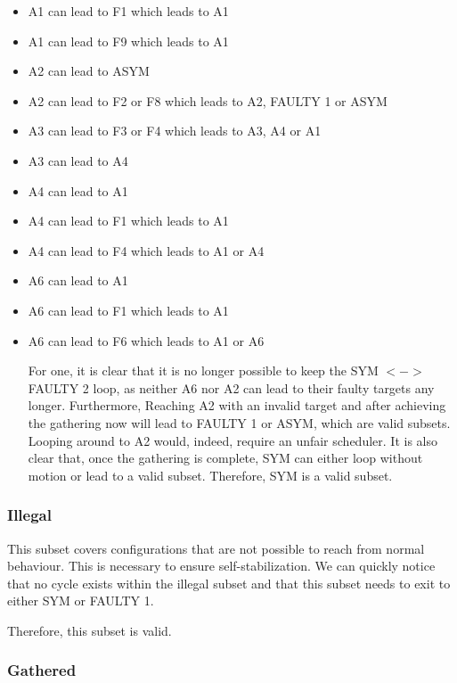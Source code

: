 \documentclass[11pt]{article}
\begin{document}
\begin{itemize}
\item A1 can lead to F1 which leads to A1 
\item A1 can lead to F9 which leads to A1 

\item A2 can lead to ASYM
\item A2 can lead to F2 or F8 which leads to A2, FAULTY 1 or ASYM

\item A3 can lead to F3 or F4 which leads to A3, A4 or A1
\item A3 can lead to A4 

\item A4 can lead to A1
\item A4 can lead to F1 which leads to A1 
\item A4 can lead to F4 which leads to A1 or A4

\item A6 can lead to A1 
\item A6 can lead to F1 which leads to A1 
\item A6 can lead to F6 which leads to A1 or A6

For one, it is clear that it is no longer possible to keep the SYM $<->$ FAULTY 2 loop, as neither A6 nor A2 can lead to their faulty targets any longer. Furthermore, Reaching A2 with an invalid target and after achieving the gathering now will lead to FAULTY 1 or ASYM, which are valid subsets. Looping around to A2 would, indeed, require an unfair scheduler.
It is also clear that, once the gathering is complete, SYM can either loop without motion or lead to a valid subset. Therefore, SYM is a valid subset.

\end{itemize}
\subsubsection{Illegal}

This subset covers configurations that are not possible to reach from normal behaviour. This is necessary to ensure self-stabilization. 
We can quickly notice that no cycle exists within the illegal subset and that this subset needs to exit to either SYM or FAULTY 1.

Therefore, this subset is valid.

\subsubsection{Gathered}
\end{document}
